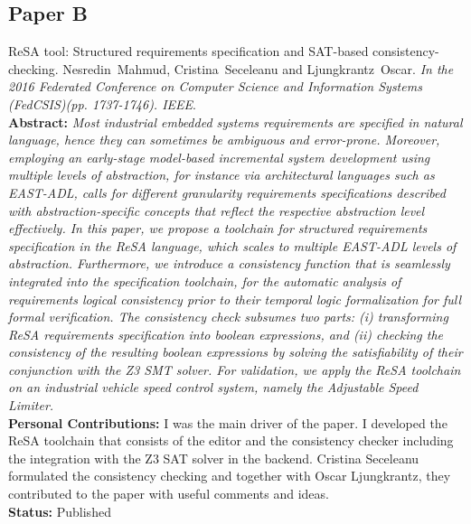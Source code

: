 \subsection*{Paper B}
ReSA tool: Structured requirements specification and SAT-based consistency-checking. Nesredin~Mahmud, Cristina~Seceleanu and Ljungkrantz~Oscar. \textit{In the 2016 Federated Conference on Computer Science and Information Systems (FedCSIS)(pp. 1737-1746). IEEE}.\label{lbl_resatool}\\[6pt]
\textbf{Abstract:} \textit{Most industrial embedded systems requirements are
	specified in natural language, hence they can sometimes be
		ambiguous and error-prone. Moreover, employing an early-stage
		model-based incremental system development using multiple
		levels of abstraction, for instance via architectural languages
		such as EAST-ADL, calls for different granularity requirements
		specifications described with abstraction-specific concepts that
		reflect the respective abstraction level effectively.
		In this paper, we propose a toolchain for structured requirements
		specification in the ReSA language, which scales to multiple
		EAST-ADL levels of abstraction. Furthermore, we introduce
		a consistency function that is seamlessly integrated into the
		specification toolchain, for the automatic analysis of requirements
		logical consistency prior to their temporal logic formalization
		for full formal verification. The consistency check subsumes
		two parts: (i) transforming ReSA requirements specification into
		boolean expressions, and (ii) checking the consistency of the
		resulting boolean expressions by solving the satisfiability of their
		conjunction with the Z3 SMT solver. For validation, we apply
		the ReSA toolchain on an industrial vehicle speed control system,
		namely the Adjustable Speed Limiter.}\\[6pt]%
	\textbf{Personal Contributions: }I was the main driver of the paper. I developed the ReSA toolchain that consists of the editor and the consistency checker including the integration with the Z3 SAT solver in the backend. Cristina Seceleanu formulated the consistency checking and together with Oscar Ljungkrantz, they contributed to the paper with useful comments and ideas.\\
		\textbf{Status: }Published

